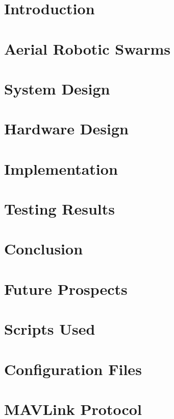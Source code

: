 \documentclass[a4paper,12pt,oneside]{book}
\begin{document}
\setcounter{tocdepth}{1}
\mainmatter
{}

\newpage
{}

\newpage
{}

\newpage
{}


\newpage

\tableofcontents
\newpage
\newpage
{}
\listoftables
\newpage
{}
\listoffigures

\chapter{Introduction}


\chapter{Aerial Robotic Swarms}


\chapter{System Design}


\chapter{Hardware Design}


\chapter{Implementation}


\chapter{Testing Results}


\chapter{Conclusion}


\chapter{Future Prospects}


\newpage
\begin{appendices}
\chapter{Scripts Used}

\chapter{Configuration Files}

\chapter{MAVLink Protocol}

\end{appendices}
\newpage


\end{document}
